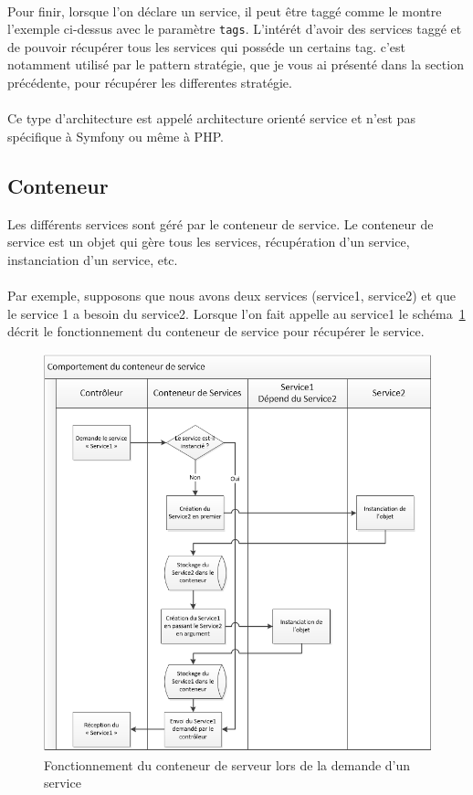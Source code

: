 \paragraph{}
Pour finir, lorsque l'on déclare un service, il peut être taggé comme le montre l'exemple ci-dessus avec le paramètre \verb?tags?.
L'intérét d'avoir des services taggé et de pouvoir récupérer tous les services qui posséde un certains tag. c'est notamment utilisé par le pattern stratégie, que je vous ai présenté dans la section précédente, pour récupérer les differentes stratégie.
\paragraph{}
Ce type d'architecture est appelé \og architecture orienté service \fg{} et n'est pas spécifique à Symfony ou même à PHP.
\subsection{Conteneur}
Les différents services sont géré par le conteneur de service. Le conteneur de service est un objet qui gère tous les services, récupération d'un service, instanciation d'un service, etc.
\paragraph{}
Par exemple, supposons que nous avons deux services (service1, service2) et que le service 1 a besoin du service2. Lorsque l'on fait appelle au service1 le schéma~\ref{conteneur} décrit le fonctionnement du conteneur de service pour récupérer le service.
		\begin{figure}[H]
        \begin{center}
          \includegraphics[scale=0.8]{images/conteneur_service}
        \end{center}
        \caption{Fonctionnement du conteneur de serveur lors de la demande d'un service}
        \label{conteneur}
      \end{figure}

